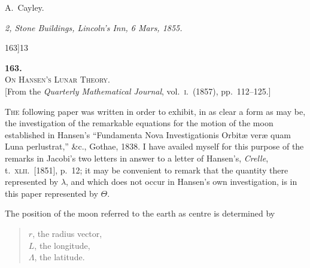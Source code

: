 \documentclass[11pt]{article}
\begin{document}
\hfill A.~Cayley.

\bigskip

\noindent\textit{2, Stone Buildings, Lincoln's Inn, 6 Mars, 1855.}

\newpage

\begin{center}
\small 163]\hfill\textsc{13}
\end{center}

\vspace{4em}

\begin{center}
{\large\textbf{163.}}\\[1em]
{\large\scshape On Hansen's Lunar Theory.}\\[1em]
{\small [From the \textit{Quarterly Mathematical Journal}, vol.~\textsc{i}.\ (1857), pp.~112--125.]}
\end{center}

\bigskip

\textsc{The} following paper was written in order to exhibit, in as clear a form as may
be, the investigation of the remarkable equations for the motion of the moon established
in Hansen's ``Fundamenta Nova Investigationis Orbit\ae{} ver\ae{} quam Luna perlustrat,''
\&c., Gothae, 1838. I have availed myself for this purpose of the remarks in Jacobi's
two letters in answer to a letter of Hansen's, \textit{Crelle}, t.~\textsc{xlii}.\ [1851], p.~12; it may
be convenient to remark that the quantity there represented by $\lambda$, and which does
not occur in Hansen's own investigation, is in this paper represented by $\Theta$.

The position of the moon referred to the earth as centre is determined by
\begin{quote}
$r$, the radius vector,\\
$L$, the longitude,\\
$\Lambda$, the latitude.
\end{quote}
\end{document}
